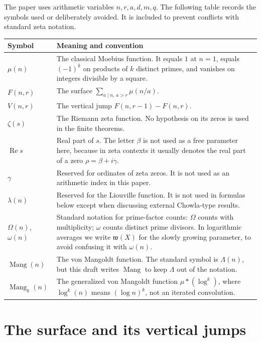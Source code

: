 \documentclass[11pt]{amsart}
\numberwithin{equation}{section}
\theoremstyle{plain}
\theoremstyle{definition}
\theoremstyle{remark}
\newcommand{\mob}{\mu}
\newcommand{\zetaR}{\zeta}
\newcommand{\Fsurf}{F}
\newcommand{\Vjump}{V}
\newcommand{\Mang}{\operatorname{Mang}}
\begin{document}
The paper uses arithmetic variables \(n,r,a,d,m,q\).  The following table records the symbols used or deliberately avoided.  It is included to prevent conflicts with standard zeta notation.

\begin{center}
\begin{tabular}{>{\raggedright\arraybackslash}p{} >{\raggedright\arraybackslash}p{}}
\toprule
Symbol & Meaning and convention\\
\midrule
\(\mob(n)\) & The classical Moebius function.  It equals \(1\) at \(n=1\), equals \((-1)^k\) on products of \(k\) distinct primes, and vanishes on integers divisible by a square.\\
\(\Fsurf(n,r)\) & The surface \(\sum_{a\mid n,\,a>r}\mob(n/a)\).\\
\(\Vjump(n,r)\) & The vertical jump \(\Fsurf(n,r-1)-\Fsurf(n,r)\).\\
\(\zetaR(s)\) & The Riemann zeta function.  No hypothesis on its zeros is used in the finite theorems.\\
\(\operatorname{Re}s\) & Real part of \(s\).  The letter \(\beta\) is not used as a free parameter here, because in zeta contexts it usually denotes the real part of a zero \(\rho=\beta+i\gamma\).\\
\(\gamma\) & Reserved for ordinates of zeta zeros.  It is not used as an arithmetic index in this paper.\\
\(\lambda(n)\) & Reserved for the Liouville function.  It is not used in formulas below except when discussing external Chowla-type results.\\
\(\Omega(n)\), \(\omega(n)\) & Standard notation for prime-factor counts: \(\Omega\) counts with multiplicity; \(\omega\) counts distinct prime divisors.  In logarithmic averages we write \(\mathfrak w(X)\) for the slowly growing parameter, to avoid confusing it with \(\omega(n)\).\\
\(\Mang(n)\) & The von Mangoldt function.  The standard symbol is \(\Lambda(n)\), but this draft writes \(\Mang\) to keep \(\Lambda\) out of the notation.\\
\(\Mang_k(n)\) & The generalized von Mangoldt function \(\mob*(\log^k)\), where \(\log^k(n)\) means \((\log n)^k\), not an iterated convolution.\\
\bottomrule
\end{tabular}
\end{center}

\section{The surface and its vertical jumps}
\label{sec:surface_jumps}
\end{document}
